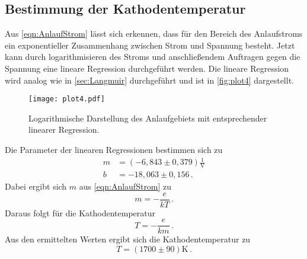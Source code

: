 \subsection{Bestimmung der Kathodentemperatur}
\label{sec:kathodetemp}
Aus \autoref{eqn:AnlaufStrom} lässt sich erkennen, dass für den Bereich des Anlaufstroms ein exponentieller
Zusammenhang zwischen Strom und Spannung besteht. Jetzt kann durch logarithmisieren des Stroms und
anschließendem Auftragen gegen die Spannung eine lineare Regression durchgeführt werden. Die lineare Regression
wird analog wie in \autoref{sec:Langmuir} durchgeführt und ist in \autoref{fig:plot4} dargestellt. 
\begin{figure}
  \centering
  \texttt{[image: plot4.pdf]}
  \caption{Logarithmische Darstellung des Anlaufgebiets mit entsprechender linearer Regression.}
  \label{fig:plot4}
\end{figure}
Die Parameter der linearen Regressionen bestimmen sich zu
\begin{align*}
  m &= (-6,843 \pm 0,379)\frac{1}{\si{\volt}} \\
  b &= -18,063 \pm 0,156\,.
\end{align*}
Dabei ergibt sich $m$ aus \autoref{eqn:AnlaufStrom} zu
\begin{equation*}
  m = -\frac{e}{kT}\,.
\end{equation*}
Daraus folgt für die Kathodentemperatur
\begin{equation*}
  T = -\frac{e}{km}\,.
\end{equation*}
Aus den ermittelten Werten ergibt sich die Kathodentemperatur zu
\begin{equation*}
  T = (1700 \pm 90)\si{\kelvin}\,.
\end{equation*}


